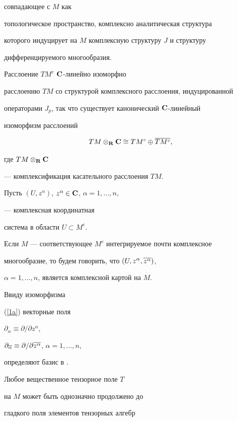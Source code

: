 совпадающее с $M$ как


топологическое пространство, комплексно аналитическая структура


которого индуцирует на $M$ комплексную структуру $J$ и структуру


дифференцируемого многообразия.


Расслоение $TM^c$\; ${\bold C}$-линейно изоморфно


расслоению $TM$ со структурой комплексного расслоения, индуцированной


операторами $J_p$, так что существует канонический ${\bold C}$-линейный


изоморфизм расслоений


\begin{equation}


\label{1a}


TM \otimes_{\bold R}{\bold C} \cong TM^c \oplus \ol{TM^c},


\end{equation}


где $TM\otimes_{\bold R} {\bold C}$


--- комплексификация касательного расслоения $TM$.





Пусть $(U, z^{\alpha})$, $z^\alpha \in {\bold C}$, $\alpha=1,\dotsc,n$,


--- комплексная координатная


система в области $U \subset M^c$.


Если $M$ --- соответствующее $M^c$ интегрируемое почти комплексное


многообразие, то будем говорить, что $(U,z^\alpha, \overline{z^\alpha})$,


$\alpha=1,\dotsc,n$, является комплексной картой на $M$.


Ввиду изоморфизма


(\ref{1a}) векторные поля


$\partial_\alpha \equiv \partial / \partial z^{\alpha}$,


$\partial_{\ol \alpha} \equiv \partial / \partial


\overline{z^{\alpha}}$, $\alpha=1,\dotsc,n$,


определяют базис в \tmc.


Любое вещественное тензорное поле $T$


на $M$ может быть однозначно продолжено до


гладкого поля элементов тензорных алгебр


